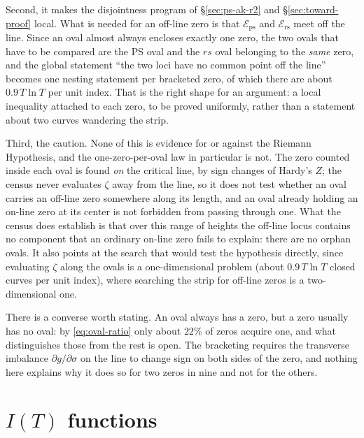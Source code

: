 \documentclass[11pt]{article}
\theoremstyle{definition}
\begin{document}
Second, it makes the disjointness program of \S\ref{sec:ps-ak-r2} and
\S\ref{sec:toward-proof} local. What is needed for an off-line zero is that
$\mathcal{E}_{\mathrm{ps}}$ and $\mathcal{E}_{\mathrm{rs}}$ meet off the line.
Since an oval almost always encloses exactly one zero, the two ovals that have to be
compared are the PS oval and the $rs$ oval belonging to the \emph{same} zero,
and the global statement ``the two loci have no common point off the line''
becomes one nesting statement per bracketed zero, of which there are about
$0.9\,T\ln T$ per unit index. That is the right shape for an argument: a local
inequality attached to each zero, to be proved uniformly, rather than a
statement about two curves wandering the strip.

Third, the caution. None of this is evidence for or against the Riemann
Hypothesis, and the one-zero-per-oval law in particular is not. The zero counted
inside each oval is found \emph{on} the critical line, by sign changes of
Hardy's $Z$; the census never evaluates $\zeta$ away from the line, so it does
not test whether an oval carries an off-line zero somewhere along its length,
and an oval already holding an on-line zero at its center is not forbidden from
passing through one. What the census does establish is that over this range of
heights the off-line locus contains no component that an ordinary on-line zero
fails to explain: there are no orphan ovals. It also points at the search that
would test the hypothesis directly, since evaluating $\zeta$ along the ovals is
a one-dimensional problem (about $0.9\,T\ln T$ closed curves per unit index),
where searching the strip for off-line zeros is a two-dimensional one.

There is a converse worth stating. An oval always has a zero, but a zero usually has no oval: by
\eqref{eq:oval-ratio} only about $22\%$ of zeros acquire one, and what
distinguishes those from the rest is open. The bracketing requires the
transverse imbalance $\partial g/\partial\sigma$ on the line to change sign on
both sides of the zero, and nothing here explains why it does so for two zeros
in nine and not for the others.

\clearpage
\section{\texorpdfstring{$I(T)$}{I(T)} functions}\label{sec:IT-functions}
\end{document}
